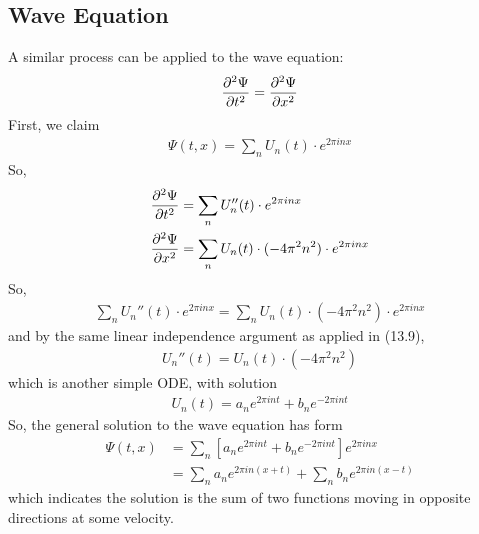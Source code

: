 \subsection{Wave Equation}
A similar process can be applied to the wave equation:
\begin{align}
    \pdv[2]{\Psi}{t} = \pdv[2]{\Psi}{x}
\end{align}
First, we claim
\begin{align}
    \Psi(t, x) = \sum_n U_n(t) \cdot e^{2\pi in x}
\end{align}
So,
\begin{align}
    \pdv[2]{\Psi}{t} &= \sum_n U_n''(t) \cdot e^{2\pi in x}\\
    \pdv[2]{\Psi}{x} &= \sum_n U_n(t) \cdot (-4\pi^2n^2) \cdot e^{2\pi in x}
\end{align}
So,
\begin{align}
    \sum_n U_n''(t) \cdot e^{2\pi in x} = \sum_n U_n(t) \cdot (-4\pi^2n^2) \cdot e^{2\pi in x}
\end{align}
and by the same linear independence argument as applied in (13.9),
\begin{align}
    U_n''(t) = U_n(t) \cdot (-4\pi^2n^2)
\end{align}
which is another simple ODE, with solution
\begin{align}
    U_n(t) = a_n e^{2\pi in t} + b_n e^{-2\pi in t}
\end{align}
So, the general solution to the wave equation has form
\begin{align}
    \Psi(t, x) &= \sum_n \left[ a_n e^{2\pi in t} + b_n e^{-2\pi in t} \right] e^{2\pi inx}\\
    &= \sum_n a_n e^{2\pi in (x + t)} + \sum_n b_n e^{2\pi in (x - t)}
\end{align}
which indicates the solution is the sum of two functions moving in opposite directions at some velocity.